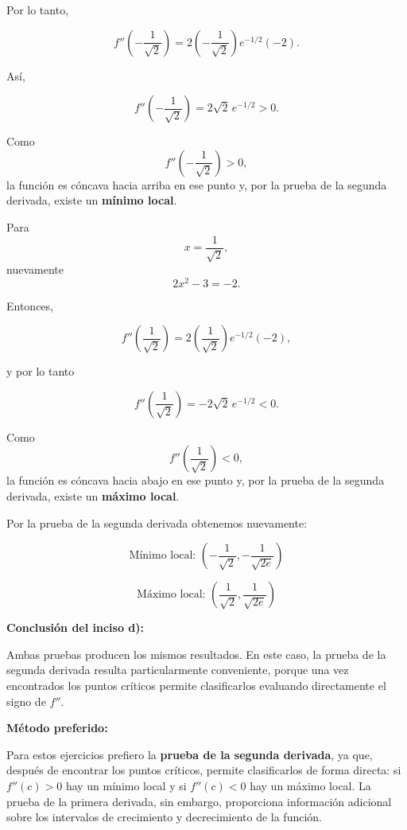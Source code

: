 \documentclass[12pt]{article}
\begin{document}
\begin{enumerate}[label=\alph*.-]
    Por lo tanto,

    \[
    f''\left(-\frac{1}{\sqrt2}\right)
    =
    2\left(-\frac{1}{\sqrt2}\right)
    e^{-1/2}(-2).
    \]

    Así,

    \[
    f''\left(-\frac{1}{\sqrt2}\right)
    =
    2\sqrt2\,e^{-1/2}>0.
    \]

    Como
    \[
    f''\left(-\frac{1}{\sqrt2}\right)>0,
    \]
    la función es cóncava hacia arriba en ese punto y, por la prueba
    de la segunda derivada, existe un \textbf{mínimo local}.

    Para
    \[
    x=\frac{1}{\sqrt2},
    \]
    nuevamente
    \[
    2x^2-3=-2.
    \]

    Entonces,

    \[
    f''\left(\frac{1}{\sqrt2}\right)
    =
    2\left(\frac{1}{\sqrt2}\right)
    e^{-1/2}(-2),
    \]

    y por lo tanto

    \[
    f''\left(\frac{1}{\sqrt2}\right)
    =
    -2\sqrt2\,e^{-1/2}<0.
    \]

    Como
    \[
    f''\left(\frac{1}{\sqrt2}\right)<0,
    \]
    la función es cóncava hacia abajo en ese punto y, por la prueba
    de la segunda derivada, existe un \textbf{máximo local}.

    Por la prueba de la segunda derivada obtenemos nuevamente:

    \[
    \boxed{
    \text{Mínimo local: }
    \left(-\frac{1}{\sqrt2},
    -\frac{1}{\sqrt{2e}}\right)
    }
    \]

    \[
    \boxed{
    \text{Máximo local: }
    \left(\frac{1}{\sqrt2},
    \frac{1}{\sqrt{2e}}\right)
    }
    \]

    \textbf{Conclusión del inciso d):}

    Ambas pruebas producen los mismos resultados. En este caso,
    la prueba de la segunda derivada resulta particularmente conveniente,
    porque una vez encontrados los puntos críticos permite clasificarlos
    evaluando directamente el signo de $f''$.

    \vspace{0.5cm}

    \textbf{Método preferido:}

    Para estos ejercicios prefiero la \textbf{prueba de la segunda
    derivada}, ya que, después de encontrar los puntos críticos, permite
    clasificarlos de forma directa: si $f''(c)>0$ hay un mínimo local y
    si $f''(c)<0$ hay un máximo local. La prueba de la primera derivada,
    sin embargo, proporciona información adicional sobre los intervalos
    de crecimiento y decrecimiento de la función.

\end{enumerate}
\end{document}
